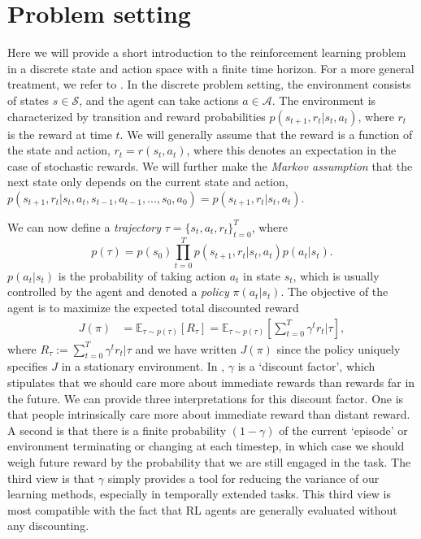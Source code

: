 \section{Problem setting}
\label{sec:problem_setting}

Here we will provide a short introduction to the reinforcement learning problem in a discrete state and action space with a finite time horizon.
For a more general treatment, we refer to \citet{sutton2018reinforcement}.
In the discrete problem setting, the environment consists of states $s \in \mathcal{S}$, and the agent can take actions $a \in \mathcal{A}$.
The environment is characterized by transition and reward probabilities $p(s_{t+1}, r_t | s_t, a_t)$, where $r_t$ is the reward at time $t$.
We will generally assume that the reward is a function of the state and action, $r_t = r(s_t, a_t)$, where this denotes an expectation in the case of stochastic rewards.
We will further make the \emph{Markov assumption} that the next state only depends on the current state and action, $p(s_{t+1}, r_t | s_t, a_t, s_{t-1}, a_{t-1}, ..., s_0, a_0) = p(s_{t+1}, r_t | s_t, a_t)$.

We can now define a \emph{trajectory} $\tau = \{ s_t, a_t, r_t \}_{t = 0}^T$, where
\begin{equation}
    p(\tau) = p(s_0) \prod_{t = 0}^T p(s_{t+1}, r_t | s_t, a_t) p(a_t|s_t).
\end{equation}
$p(a_t|s_t)$ is the probability of taking action $a_t$ in state $s_t$, which is usually controlled by the agent and denoted a \emph{policy} $\pi(a_t|s_t)$.
The objective of the agent is to maximize the expected total discounted reward
\begin{align}
    \label{eq:RL_objective}
    J(\pi) &= \mathbb{E}_{\tau \sim p(\tau)} \left [ R_\tau \right ] = \mathbb{E}_{\tau \sim p(\tau)} \left [ \sum_{t=0}^T \gamma^t r_t | \tau \right ],
\end{align}
where $R_\tau := \sum_{t=0}^T \gamma^t r_t | \tau$ and we have written $J(\pi)$ since the policy uniquely specifies $J$ in a stationary environment.
In , $\gamma$ is a `discount factor', which stipulates that we should care more about immediate rewards than rewards far in the future.
We can provide three interpretations for this discount factor.
One is that people intrinsically care more about immediate reward than distant reward.
A second is that there is a finite probability $(1-\gamma)$ of the current `episode' or environment terminating or changing at each timestep, in which case we should weigh future reward by the probability that we are still engaged in the task.
The third view is that $\gamma$ simply provides a tool for reducing the variance of our learning methods, especially in temporally extended tasks.
This third view is most compatible with the fact that RL agents are generally evaluated without any discounting.

